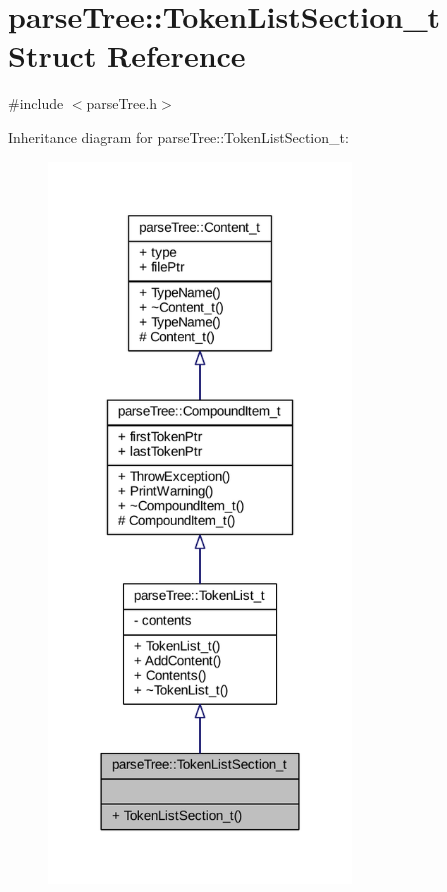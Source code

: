 \hypertarget{structparse_tree_1_1_token_list_section__t}{}\section{parse\+Tree\+:\+:Token\+List\+Section\+\_\+t Struct Reference}
\label{structparse_tree_1_1_token_list_section__t}


{\ttfamily \#include $<$parse\+Tree.\+h$>$}



Inheritance diagram for parse\+Tree\+:\+:Token\+List\+Section\+\_\+t\+:
\nopagebreak
\begin{figure}[H]
\begin{center}
\leavevmode
\includegraphics[width=228pt]{structparse_tree_1_1_token_list_section__t__inherit__graph}
\end{center}
\end{figure}



